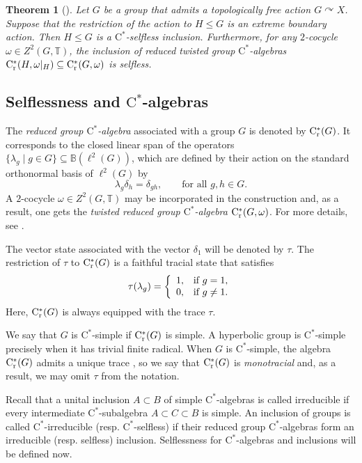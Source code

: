 \documentclass[11pt]{article}
\newtheorem{thm}{Theorem}[section]
\theoremstyle{definition}
\theoremstyle{remark}
\numberwithin{equation}{section}
\numberwithin{equation}{section}
\newcommand{\Cs}{\ensuremath{\mathrm{C}^\ast}}
\newcommand{\Csr}{\mathrm{C}^\ast_{\rm r}}
\numberwithin{equation}{section}
\begin{document}
\begin{thm}[{\cite[Theorem A, Proposition 1.4]{FKOCP26}}]\label{finind}
    Let $G$ be a group that admits a topologically free action $G\curvearrowright X$. Suppose that the restriction of the action to $H\leq G$ is an extreme boundary action. Then $H\leq G$ is a \Cs-selfless inclusion. Furthermore, for any $2$-cocycle $\omega\in Z^2(G,\mathbb T)$, the inclusion of reduced twisted group \Cs-algebras $\Csr(H,\omega|_H) \subseteq \Csr(G,\omega)$ is selfless.
\end{thm}




\subsection{Selflessness and \Cs-algebras}

The \emph{reduced group \Cs-algebra} associated with a group $G$ is denoted by $\Csr(G)$. It corresponds to the closed linear span of the operators $\{\lambda_g \mid g\in G\}\subseteq \mathbb B(\ell^2(G))$, which are defined by their action on the standard orthonormal basis of $\ell^2(G)$ by
$$
\lambda_g\delta_h=\delta_{gh}, \quad \quad\text{for all }g,h\in G.
$$
A $2$-cocycle $\omega\in Z^2(G,\mathbb T)$ may be incorporated in the construction and, as a result, one gets the \emph{twisted reduced group \Cs-algebra} $\Csr(G,\omega)$. For more details, see \cite{FKOCP26}.

The vector state associated with the vector $\delta_1$ will be denoted by $\tau$. The restriction of $\tau$ to $\Csr(G)$ is a faithful tracial state that satisfies
$$
\tau(\lambda_g)=\left\{\begin{array}{ll}
1,    & \textup{if\ } g=1, \\
0,     & \textup{if\ } g\not=1. \\
\end{array}\right.
$$
Here, $\Csr(G)$ is always equipped with the trace $\tau$.

We say that $G$ is \Cs-simple if $\Csr(G)$ is simple. A hyperbolic group is \Cs-simple precisely when it has trivial finite radical. When $G$ is \Cs-simple, the algebra $\Csr(G)$ admits a unique trace \cite{BKKO17}, so we say that $\Csr(G)$ is \emph{monotracial} and, as a result, we may omit $\tau$ from the notation.

Recall that a unital inclusion $A\subset B$ of simple \Cs-algebras is called irreducible if every intermediate \Cs-subalgebra $A\subset C\subset B$ is simple. An inclusion of groups is called \Cs-irreducible (resp. \Cs-selfless) if their reduced group \Cs-algebras form an irreducible (resp. selfless) inclusion. Selflessness for \Cs-algebras and inclusions will be defined now.
\end{document}
